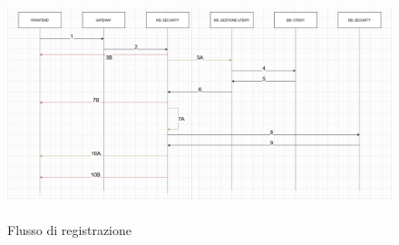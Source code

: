 \begin{center}
    \begin{figure}[h]
        \includegraphics[width=450px, height=250px]{./images/registrazione.png}
        \caption{Flusso di registrazione}
        \label{fig:Registration}
    \end{figure}
\end{center}

